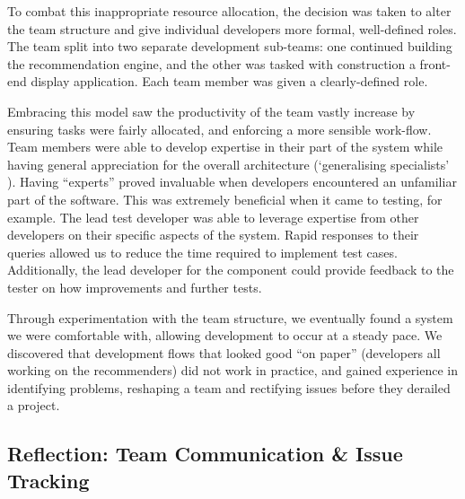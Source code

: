 \documentclass{l3proj}
\begin{document}
To combat this inappropriate resource allocation, the decision was taken to alter the team structure and give individual developers more formal, well-defined roles. The team split into two separate development sub-teams: one continued building the recommendation engine, and the other was tasked with construction a front-end display application. Each team member was given a clearly-defined role. 

Embracing this model saw the productivity of the team vastly increase by ensuring tasks were fairly allocated, and enforcing a more sensible work-flow. Team members were able to develop expertise in their part of the system while having general appreciation for the overall architecture (`generalising specialists' \cite{AgileRoles}). Having “experts” proved invaluable when developers encountered an unfamiliar part of the software. This was extremely beneficial when it came to testing, for example. The lead test developer was able to leverage expertise from other developers on their specific aspects of the system. Rapid responses to their queries allowed us to reduce the time required to implement test cases. Additionally, the lead developer for the component could provide feedback to the tester on how improvements and further tests.

Through experimentation with the team structure, we eventually found a system we were comfortable with, allowing development to occur at a steady pace. We discovered that development flows that looked good “on paper” (developers all working on the recommenders) did not work in practice, and gained experience in identifying problems, reshaping a team and rectifying issues before they derailed a project. 

\subsection{Reflection: Team Communication \& Issue Tracking}
\label{sec:communication}

\end{document}
